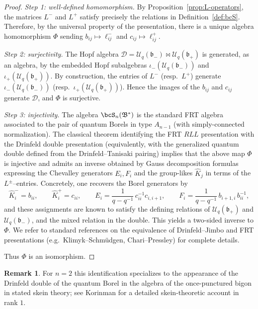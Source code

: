 \documentclass[11pt]{article}
\theoremstyle{definition}
\newtheorem{remark}{Remark}
\newcommand{\Uc}{\mathcal{U}}
\newcommand{\fb}{\mathfrak{b}}
\newcommand{\bipr}{\bowtie}
\newcommand{\Khat}{\widehat{K}}
\newcommand{\E}{E}
\newcommand{\F}{F}
\begin{document}
\begin{proof}
\emph{Step 1: well-defined homomorphism.}
By Proposition~\ref{prop:L-operators}, the matrices $L^-$ and $L^+$ satisfy precisely the relations in Definition~\ref{def:bcS}. Therefore, by the universal property of the presentation, there is a unique algebra homomorphism $\Phi$ sending $b_{ij}\mapsto \ell^-_{ij}$ and $c_{ij}\mapsto \ell^+_{ij}$.

\emph{Step 2: surjectivity.}
The Hopf algebra $\mathcal{D}=\Uc_q(\fb_-)\bipr \Uc_q(\fb_+)$ is generated, as an algebra, by the embedded Hopf subalgebras $\iota_-(\Uc_q(\fb_-))$ and $\iota_+(\Uc_q(\fb_+))$. By construction, the entries of $L^-$ (resp.\ $L^+$) generate $\iota_-(\Uc_q(\fb_-))$ (resp.\ $\iota_+(\Uc_q(\fb_+))$). Hence the images of the $b_{ij}$ and $c_{ij}$ generate $\mathcal{D}$, and $\Phi$ is surjective.

\emph{Step 3: injectivity.}
The algebra $\bcS_n(\mathfrak B^*)$ is the standard FRT algebra associated to the pair of quantum Borels in type $A_{n-1}$ (with simply-connected normalization). The classical theorem identifying the FRT $RLL$ presentation with the Drinfeld double presentation (equivalently, with the generalized quantum double defined from the Drinfeld--Tanisaki pairing) implies that the above map $\Phi$ is injective and admits an inverse obtained by Gauss decomposition formulas expressing the Chevalley generators $\E_i,\F_i$ and the group-likes $\Khat_j$ in terms of the $L^\pm$--entries. Concretely, one recovers the Borel generators by
\[
\Khat_i^- = b_{ii},\qquad
\Khat_i^+ = c_{ii},\qquad
\E_i = \frac{1}{q-q^{-1}}\,c_{ii}^{-1}c_{i,i+1},\qquad
\F_i = \frac{1}{q-q^{-1}}\,b_{i+1,i}\,b_{ii}^{-1},
\]
and these assignments are known to satisfy the defining relations of $\Uc_q(\fb_+)$ and $\Uc_q(\fb_-)$, and the mixed relation in the double. This yields a two-sided inverse to $\Phi$. We refer to standard references on the equivalence of Drinfeld--Jimbo and FRT presentations (e.g.\ Klimyk--Schm\"udgen, Chari--Pressley) for complete details.

Thus $\Phi$ is an isomorphism.
\end{proof}

\begin{remark}
For $n=2$ this identification specializes to the appearance of the Drinfeld double of the quantum Borel in the algebra of the once-punctured bigon in stated skein theory; see Korinman for a detailed skein-theoretic account in rank $1$.  %
\end{remark}
\end{document}
